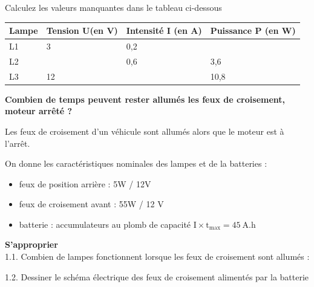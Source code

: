 \documentclass[11pt,a4paper]{article}
\newcommand{\cadreblanc}[1]{%
\medskip\framebox[\linewidth][c]{%
\rule{0mm}{#1mm}}\par
\medskip}
\begin{document}
    \vfill 
    
 Calculez les valeurs manquantes dans le tableau ci-dessous \\\begin{center}
    

    \begin{tabular}{|p{2cm}|C{2cm}|C{2cm}|C{2cm}|}
         \hline
         Lampe & Tension U(en V) & Intensité I (en A)  & Puissance P (en W) \\
         \hline 
         L1 &  3 & 0,2  &  \\
         \hline
         L2 &  & 0,6 & 3,6 \\
         \hline 
         L3 & 12 &  & 10,8 \\
         \hline
         

    \end{tabular}\end{center}
\newpage

\begin{center}
    
\textbf{Combien de temps peuvent rester allumés les feux de croisement, moteur arrêté ? }
\end{center}

Les feux de croisement d'un véhicule sont allumés alors que le moteur est à l'arrêt.  

On donne les caractéristiques nominales des lampes et de la batteries : 
\begin{itemize}
    \item feux de position arrière : 5W / 12V 
    \item feux de croisement avant : 55W / 12 V
    \item batterie : accumulateurs au plomb de capacité $\mathrm{I \times t_{max} = 45 ~A.h}$
\end{itemize}

\textbf{ S'approprier} \\

1.1. Combien de lampes fonctionnent lorsque les feux de croisement sont allumés : \dotfill \\



 


\begin{minipage}{.5\textwidth}%

1.2. Dessiner le schéma électrique des feux de croisement alimentés par la batterie 

\end{minipage}%
\hfill
\begin{minipage}{.45\textwidth}%
\cadreblanc{35}
\end{minipage}%
\end{document}
